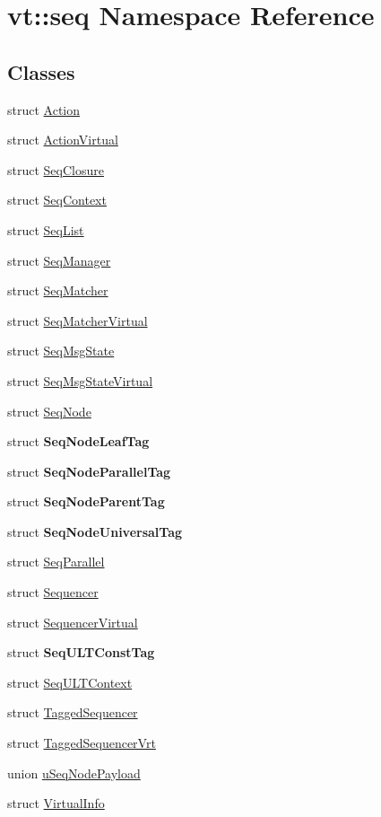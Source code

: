 \hypertarget{namespacevt_1_1seq}{}\section{vt\+:\+:seq Namespace Reference}
\label{namespacevt_1_1seq}
\subsection*{Classes}
\begin{DoxyCompactItemize}
\item 
struct \hyperlink{structvt_1_1seq_1_1_action}{Action}
\item 
struct \hyperlink{structvt_1_1seq_1_1_action_virtual}{Action\+Virtual}
\item 
struct \hyperlink{structvt_1_1seq_1_1_seq_closure}{Seq\+Closure}
\item 
struct \hyperlink{structvt_1_1seq_1_1_seq_context}{Seq\+Context}
\item 
struct \hyperlink{structvt_1_1seq_1_1_seq_list}{Seq\+List}
\item 
struct \hyperlink{structvt_1_1seq_1_1_seq_manager}{Seq\+Manager}
\item 
struct \hyperlink{structvt_1_1seq_1_1_seq_matcher}{Seq\+Matcher}
\item 
struct \hyperlink{structvt_1_1seq_1_1_seq_matcher_virtual}{Seq\+Matcher\+Virtual}
\item 
struct \hyperlink{structvt_1_1seq_1_1_seq_msg_state}{Seq\+Msg\+State}
\item 
struct \hyperlink{structvt_1_1seq_1_1_seq_msg_state_virtual}{Seq\+Msg\+State\+Virtual}
\item 
struct \hyperlink{structvt_1_1seq_1_1_seq_node}{Seq\+Node}
\item 
struct {\bfseries Seq\+Node\+Leaf\+Tag}
\item 
struct {\bfseries Seq\+Node\+Parallel\+Tag}
\item 
struct {\bfseries Seq\+Node\+Parent\+Tag}
\item 
struct {\bfseries Seq\+Node\+Universal\+Tag}
\item 
struct \hyperlink{structvt_1_1seq_1_1_seq_parallel}{Seq\+Parallel}
\item 
struct \hyperlink{structvt_1_1seq_1_1_sequencer}{Sequencer}
\item 
struct \hyperlink{structvt_1_1seq_1_1_sequencer_virtual}{Sequencer\+Virtual}
\item 
struct {\bfseries Seq\+U\+L\+T\+Const\+Tag}
\item 
struct \hyperlink{structvt_1_1seq_1_1_seq_u_l_t_context}{Seq\+U\+L\+T\+Context}
\item 
struct \hyperlink{structvt_1_1seq_1_1_tagged_sequencer}{Tagged\+Sequencer}
\item 
struct \hyperlink{structvt_1_1seq_1_1_tagged_sequencer_vrt}{Tagged\+Sequencer\+Vrt}
\item 
union \hyperlink{unionvt_1_1seq_1_1u_seq_node_payload}{u\+Seq\+Node\+Payload}
\item 
struct \hyperlink{structvt_1_1seq_1_1_virtual_info}{Virtual\+Info}
\end{DoxyCompactItemize}
